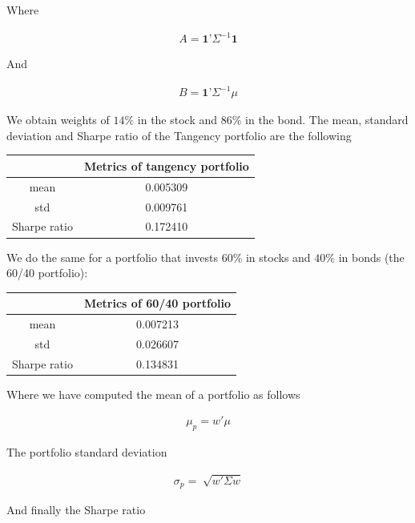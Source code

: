 \documentclass[10pt]{article}
\newenvironment{exercise}[2][Exercise]{\begin{trivlist}
  \item[\hskip \labelsep {\bfseries #1}\hskip \labelsep {\bfseries #2.}]}{\end{trivlist}}
\begin{document}
\begin{exercise}{3}
	Where
	
	\begin{align*}
		A = \textbf{1'}\Sigma^{-1}\textbf{1}
	\end{align*}
	
	And 
	
	\begin{align*}
		B = \textbf{1'}\Sigma^{-1}\mu
	\end{align*}
	
	We obtain weights of $14\%$ in the stock and $86\%$ in the bond. The mean, standard deviation and Sharpe ratio of the Tangency portfolio are the following
	
	\begin{table}[h!]
		\centering
 		\begin{tabular}{||c c||} 
 			\hline
 			& Metrics of tangency portfolio \\ [0.5ex] 
 			\hline\hline
 			mean & 0.005309 \\ 
 			std & 0.009761 \\
 			Sharpe ratio & 0.172410 \\ [1ex] 
 			\hline
		 \end{tabular}
	\end{table}	

	We do the same for a portfolio that invests $60\%$ in stocks and $40\%$ in bonds (the 60/40 portfolio):

	\begin{table}[h!]
		\centering
 		\begin{tabular}{||c c||} 
 			\hline
 			& Metrics of 60/40 portfolio \\ [0.5ex] 
 			\hline\hline
 			mean & 0.007213 \\ 
 			std & 0.026607 \\
 			Sharpe ratio & 0.134831 \\ [1ex] 
 			\hline
		 \end{tabular}
	\end{table}	
	
	Where we have computed the mean of a portfolio as follows
	
	\begin{align*}
		\mu_{p} = w'\mu
	\end{align*}
	
	The portfolio standard deviation
	
	\begin{align*}
		\sigma_{p} = \sqrt[]{w'\Sigma w}
	\end{align*}

	And finally the Sharpe ratio
	

\end{exercise}
\end{document}

